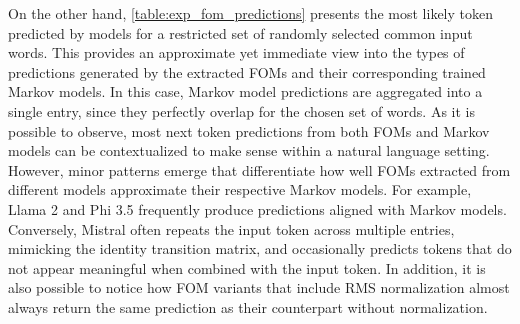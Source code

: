 On the other hand, \cref{table:exp_fom_predictions} presents the most likely token predicted by models for a restricted set of randomly selected common input words.
This provides an approximate yet immediate view into the types of predictions generated by the extracted FOMs and their corresponding trained Markov models.
In this case, Markov model predictions are aggregated into a single entry, since they perfectly overlap for the chosen set of words.
As it is possible to observe, most next token predictions from both FOMs and Markov models can be contextualized to make sense within a natural language setting.
However, minor patterns emerge that differentiate how well FOMs extracted from different models approximate their respective Markov models.
For example, Llama 2 and Phi 3.5 frequently produce predictions aligned with Markov models.
Conversely, Mistral often repeats the input token across multiple entries, mimicking the identity transition matrix, and occasionally predicts tokens that do not appear meaningful when combined with the input token.
In addition, it is also possible to notice how FOM variants that include RMS normalization almost always return the same prediction as their counterpart without normalization.

\begin{table}
    \centering
    \caption{}
    \label{table:exp_fom_predictions}
\end{table}

